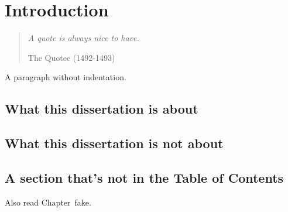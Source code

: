 %
%

\chapter{Introduction}


\begin{quote}

{\em A quote is always nice to have.}

 The Quotee (1492-1493)

\end{quote}


\noindent
A paragraph without indentation.



\section{What this dissertation is about}

\section{What this dissertation is not about}



\pagebreak
\section*{A section that's not in the Table of Contents}

Also read Chapter~fake.



